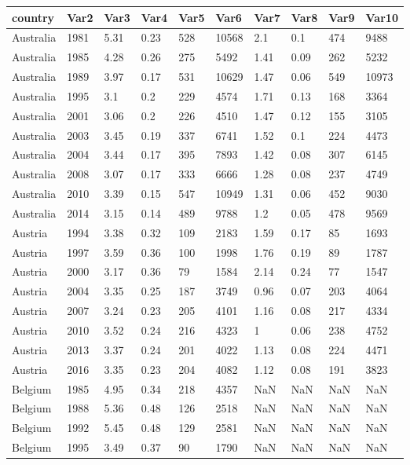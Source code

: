 \begin{tabular}{llllllllll}
country & Var2 & Var3 & Var4 & Var5 & Var6 & Var7 & Var8 & Var9 & Var10 \\ 
\hline 
Australia & 1981 & 5.31 & 0.23 & 528 & 10568 & 2.1 & 0.1 & 474 & 9488 \\ 
Australia & 1985 & 4.28 & 0.26 & 275 & 5492 & 1.41 & 0.09 & 262 & 5232 \\ 
Australia & 1989 & 3.97 & 0.17 & 531 & 10629 & 1.47 & 0.06 & 549 & 10973 \\ 
Australia & 1995 & 3.1 & 0.2 & 229 & 4574 & 1.71 & 0.13 & 168 & 3364 \\ 
Australia & 2001 & 3.06 & 0.2 & 226 & 4510 & 1.47 & 0.12 & 155 & 3105 \\ 
Australia & 2003 & 3.45 & 0.19 & 337 & 6741 & 1.52 & 0.1 & 224 & 4473 \\ 
Australia & 2004 & 3.44 & 0.17 & 395 & 7893 & 1.42 & 0.08 & 307 & 6145 \\ 
Australia & 2008 & 3.07 & 0.17 & 333 & 6666 & 1.28 & 0.08 & 237 & 4749 \\ 
Australia & 2010 & 3.39 & 0.15 & 547 & 10949 & 1.31 & 0.06 & 452 & 9030 \\ 
Australia & 2014 & 3.15 & 0.14 & 489 & 9788 & 1.2 & 0.05 & 478 & 9569 \\ 
Austria & 1994 & 3.38 & 0.32 & 109 & 2183 & 1.59 & 0.17 & 85 & 1693 \\ 
Austria & 1997 & 3.59 & 0.36 & 100 & 1998 & 1.76 & 0.19 & 89 & 1787 \\ 
Austria & 2000 & 3.17 & 0.36 & 79 & 1584 & 2.14 & 0.24 & 77 & 1547 \\ 
Austria & 2004 & 3.35 & 0.25 & 187 & 3749 & 0.96 & 0.07 & 203 & 4064 \\ 
Austria & 2007 & 3.24 & 0.23 & 205 & 4101 & 1.16 & 0.08 & 217 & 4334 \\ 
Austria & 2010 & 3.52 & 0.24 & 216 & 4323 & 1 & 0.06 & 238 & 4752 \\ 
Austria & 2013 & 3.37 & 0.24 & 201 & 4022 & 1.13 & 0.08 & 224 & 4471 \\ 
Austria & 2016 & 3.35 & 0.23 & 204 & 4082 & 1.12 & 0.08 & 191 & 3823 \\ 
Belgium & 1985 & 4.95 & 0.34 & 218 & 4357 & NaN & NaN & NaN & NaN \\ 
Belgium & 1988 & 5.36 & 0.48 & 126 & 2518 & NaN & NaN & NaN & NaN \\ 
Belgium & 1992 & 5.45 & 0.48 & 129 & 2581 & NaN & NaN & NaN & NaN \\ 
Belgium & 1995 & 3.49 & 0.37 & 90 & 1790 & NaN & NaN & NaN & NaN \\ 

\end{tabular}
